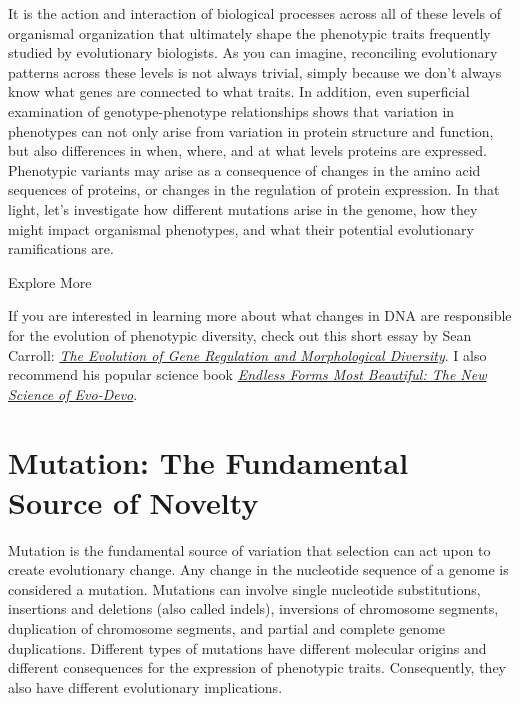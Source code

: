 \documentclass[
]{book}
\begin{document}
It is the action and interaction of biological processes across all of these levels of organismal organization that ultimately shape the phenotypic traits frequently studied by evolutionary biologists. As you can imagine, reconciling evolutionary patterns across these levels is not always trivial, simply because we don't always know what genes are connected to what traits. In addition, even superficial examination of genotype-phenotype relationships shows that variation in phenotypes can not only arise from variation in protein structure and function, but also differences in when, where, and at what levels proteins are expressed. Phenotypic variants may arise as a consequence of changes in the amino acid sequences of proteins, or changes in the regulation of protein expression. In that light, let's investigate how different mutations arise in the genome, how they might impact organismal phenotypes, and what their potential evolutionary ramifications are.

Explore More

If you are interested in learning more about what changes in DNA are responsible for the evolution of phenotypic diversity, check out this short essay by Sean Carroll: \href{https://www.cell.com/cell/fulltext/S0092-8674(00)80868-5}{\emph{The Evolution of Gene Regulation and Morphological Diversity}}. I also recommend his popular science book \href{https://www.amazon.com/Endless-Forms-Most-Beautiful-Science/dp/0393327795}{\emph{Endless Forms Most Beautiful: The New Science of Evo-Devo}}.

\hypertarget{mutation-the-fundamental-source-of-novelty}{%
\section{Mutation: The Fundamental Source of Novelty}\label{mutation-the-fundamental-source-of-novelty}}

Mutation is the fundamental source of variation that selection can act upon to create evolutionary change. Any change in the nucleotide sequence of a genome is considered a mutation. Mutations can involve single nucleotide substitutions, insertions and deletions (also called indels), inversions of chromosome segments, duplication of chromosome segments, and partial and complete genome duplications. Different types of mutations have different molecular origins and different consequences for the expression of phenotypic traits. Consequently, they also have different evolutionary implications.
\end{document}
